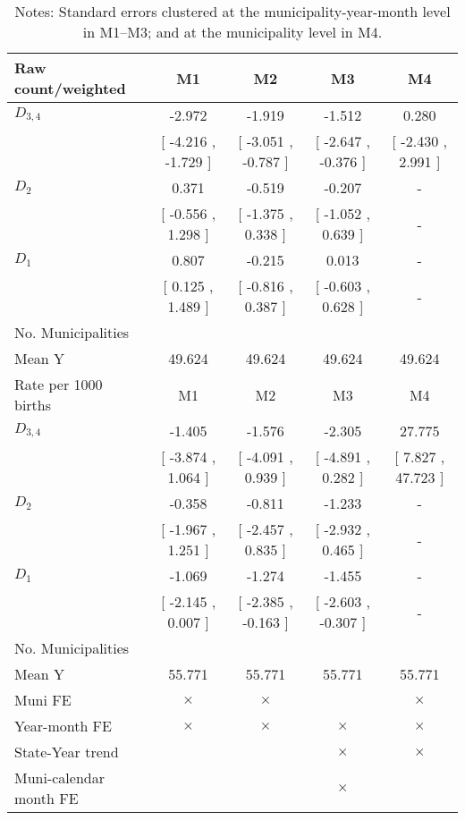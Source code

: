 \begin{table}[!ht]
\centering
\caption{Effects of Drought on preterml37}\label{tab:twfe_preterml37}
\fontsize{10pt}{12pt}\selectfont
\begin{tabular}{lcccc}
\toprule
  Raw count/weighted &\multicolumn{1}{c}{M1}&\multicolumn{1}{c}{M2}&\multicolumn{1}{c}{M3}&\multicolumn{1}{c}{M4} \\
\midrule
 $ D_{3,4} $ &    -2.972 &    -1.919 &    -1.512 &     0.280 \\ 
 & [    -4.216 ,    -1.729 ] & [    -3.051 ,    -0.787 ] & [    -2.647 ,    -0.376 ] & [    -2.430 ,     2.991 ] \\ 
\addlinespace
 $ D_2 $ &     0.371 &    -0.519 &    -0.207 & - \\ 
 & [    -0.556 ,     1.298 ] & [    -1.375 ,     0.338 ] & [    -1.052 ,     0.639 ] & - \\ 
\addlinespace
 $ D_1 $ &     0.807 &    -0.215 &     0.013 & - \\ 
 & [     0.125 ,     1.489 ] & [    -0.816 ,     0.387 ] & [    -0.603 ,     0.628 ] & - \\ 
\addlinespace
\midrule
  No. Municipalities &  &  &  &   \\
  Mean Y &    49.624 &    49.624 &    49.624 &    49.624  \\
\addlinespace
\midrule
  Rate per 1000 births &\multicolumn{1}{c}{M1}&\multicolumn{1}{c}{M2}&\multicolumn{1}{c}{M3}&\multicolumn{1}{c}{M4} \\
\midrule
 $ D_{3,4} $ &    -1.405 &    -1.576 &    -2.305 &    27.775 \\ 
 & [    -3.874 ,     1.064 ] & [    -4.091 ,     0.939 ] & [    -4.891 ,     0.282 ] & [     7.827 ,    47.723 ] \\ 
\addlinespace
 $ D_2 $ &    -0.358 &    -0.811 &    -1.233 & - \\ 
 & [    -1.967 ,     1.251 ] & [    -2.457 ,     0.835 ] & [    -2.932 ,     0.465 ] & - \\ 
\addlinespace
 $ D_1 $ &    -1.069 &    -1.274 &    -1.455 & - \\ 
 & [    -2.145 ,     0.007 ] & [    -2.385 ,    -0.163 ] & [    -2.603 ,    -0.307 ] & - \\ 
\midrule
  No. Municipalities &  &  &  &   \\
  Mean Y &    55.771 &    55.771 &    55.771 &    55.771  \\
  Muni FE & $ \times $ & $ \times $ &  & $ \times $  \\
  Year-month FE & $ \times $ & $ \times $ & $ \times $ & $ \times $ \\
  State-Year trend &  &  & $ \times $ & $ \times $ \\
  Muni-calendar month FE &  &  & $ \times $ & \\
\bottomrule
\end{tabular}
\caption*{\footnotesize{Notes: Standard errors clustered at the municipality-year-month level in M1--M3; and at the municipality level in M4.}}
\end{table}
